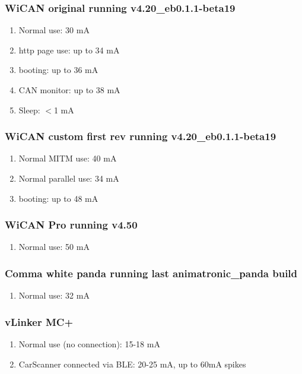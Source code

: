 \documentclass[superscriptaddress,onecolumn,floatfix]{revtex4-2}
\begin{document}
\subsubsection{WiCAN original running v4.20\_eb0.1.1-beta19}
\begin{enumerate}
  \item{Normal use:} 30 mA
  \item{http page use:} up to 34 mA
  \item{booting:} up to 36 mA
  \item{CAN monitor:} up to 38 mA
  \item{Sleep:} $<$1 mA
\end{enumerate}

\subsubsection{WiCAN custom first rev running v4.20\_eb0.1.1-beta19}
\begin{enumerate}
  \item{Normal MITM use:} 40 mA
  \item{Normal parallel use:} 34 mA
  \item{booting:} up to 48 mA
\end{enumerate}

\subsubsection{WiCAN Pro running v4.50}
\begin{enumerate}
  \item{Normal use:} 50 mA
\end{enumerate}

\subsubsection{Comma white panda running last animatronic\_panda build}
\begin{enumerate}
  \item{Normal use:} 32 mA
\end{enumerate}

\subsubsection{vLinker MC+}
\begin{enumerate}
  \item{Normal use (no connection):} 15-18 mA
  \item{CarScanner connected via BLE:} 20-25 mA, up to 60mA spikes
\end{enumerate}
\end{document}
